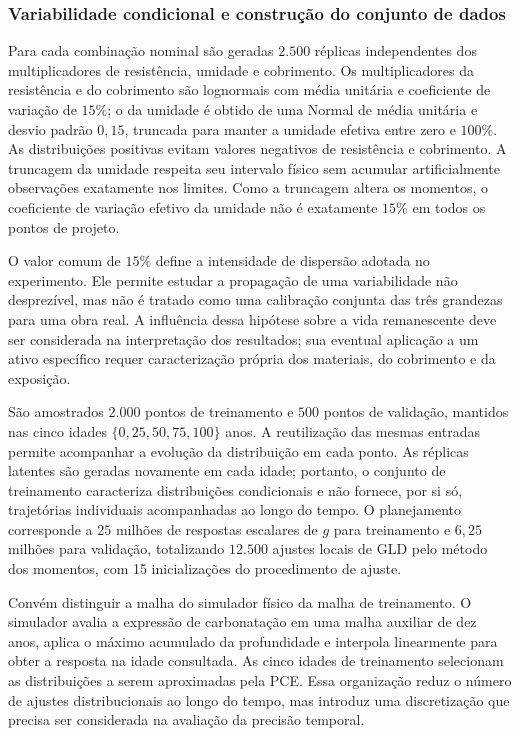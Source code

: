 \subsubsection{Variabilidade condicional e construção do conjunto de dados}

Para cada combinação nominal são geradas $2.500$ réplicas independentes dos multiplicadores de resistência, umidade e cobrimento. Os multiplicadores da resistência e do cobrimento são lognormais com média unitária e coeficiente de variação de $15\%$; o da umidade é obtido de uma Normal de média unitária e desvio padrão $0{,}15$, truncada para manter a umidade efetiva entre zero e $100\%$. As distribuições positivas evitam valores negativos de resistência e cobrimento. A truncagem da umidade respeita seu intervalo físico sem acumular artificialmente observações exatamente nos limites. Como a truncagem altera os momentos, o coeficiente de variação efetivo da umidade não é exatamente $15\%$ em todos os pontos de projeto.

O valor comum de $15\%$ define a intensidade de dispersão adotada no experimento. Ele permite estudar a propagação de uma variabilidade não desprezível, mas não é tratado como uma calibração conjunta das três grandezas para uma obra real. A influência dessa hipótese sobre a vida remanescente deve ser considerada na interpretação dos resultados; sua eventual aplicação a um ativo específico requer caracterização própria dos materiais, do cobrimento e da exposição.

São amostrados $2.000$ pontos de treinamento e $500$ pontos de validação, mantidos nas cinco idades $\{0,25,50,75,100\}$ anos. A reutilização das mesmas entradas permite acompanhar a evolução da distribuição em cada ponto. As réplicas latentes são geradas novamente em cada idade; portanto, o conjunto de treinamento caracteriza distribuições condicionais e não fornece, por si só, trajetórias individuais acompanhadas ao longo do tempo. O planejamento corresponde a $25$ milhões de respostas escalares de $g$ para treinamento e $6{,}25$ milhões para validação, totalizando $12.500$ ajustes locais de GLD pelo método dos momentos, com 15 inicializações do procedimento de ajuste.

Convém distinguir a malha do simulador físico da malha de treinamento. O simulador avalia a expressão de carbonatação em uma malha auxiliar de dez anos, aplica o máximo acumulado da profundidade e interpola linearmente para obter a resposta na idade consultada. As cinco idades de treinamento selecionam as distribuições a serem aproximadas pela PCE. Essa organização reduz o número de ajustes distribucionais ao longo do tempo, mas introduz uma discretização que precisa ser considerada na avaliação da precisão temporal.

